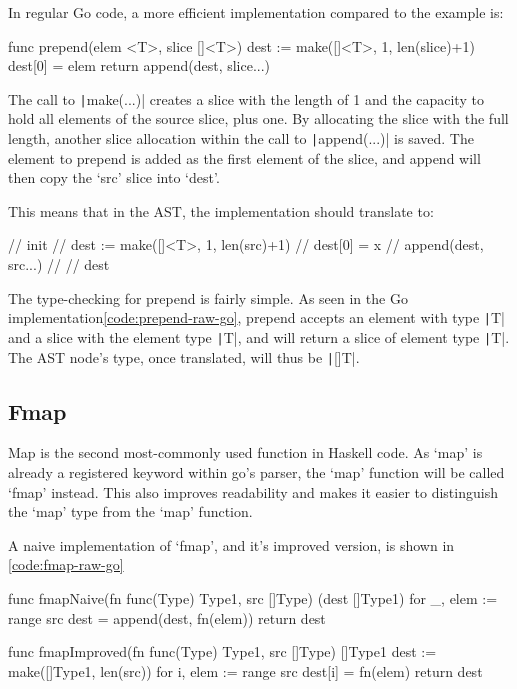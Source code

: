 In regular Go code, a more efficient implementation compared to the example is:
\begin{code}
\label{code:prepend-raw-go}
\begin{gocode}
func prepend(elem <T>, slice []<T>) {
    dest := make([]<T>, 1, len(slice)+1)
    dest[0] = elem
    return append(dest, slice...)
}
\end{gocode}
\end{code}

The call to \texttt|make(...)| creates a slice with the length of 1 and the capacity
to hold all elements of the source slice, plus one. By allocating the slice with the full
length, another slice allocation within the call to \texttt|append(...)| is saved.
The element to prepend is added as the first element of the slice, and append will then
copy the `src' slice into `dest'.

This means that in the AST, the implementation should translate to:
\begin{code}
\begin{gocode}
//   init {
//     dest := make([]<T>, 1, len(src)+1)
//     dest[0] = x
//     append(dest, src...)
//   }
//   dest
\end{gocode}
\end{code}

The type-checking for prepend is fairly simple. As seen in the Go implementation\ref{code:prepend-raw-go},
prepend accepts an element with type \texttt|T| and a slice with the element type \texttt|T|,
and will return a slice of element type \texttt|T|. The AST node's type, once translated,
will thus be \texttt|[]T|.

\subsection{Fmap}

Map is the second most-commonly used function in Haskell code. As `map' is already a registered keyword
within go's parser, the `map' function will be called `fmap' instead. This also improves readability
and makes it easier to distinguish the `map' type from the `map' function.

A naive implementation of `fmap', and it's improved version, is shown
in \ref{code:fmap-raw-go}

\begin{code}
    \label{code:fmap-raw-go}
    \begin{gocode}
func fmapNaive(fn func(Type) Type1, src []Type) (dest []Type1) {
    for _, elem := range src {
        dest = append(dest, fn(elem))
    }
    return dest
}

func fmapImproved(fn func(Type) Type1, src []Type) []Type1 {
    dest := make([]Type1, len(src))
    for i, elem := range src {
        dest[i] = fn(elem)
    }
    return dest
}
    \end{gocode}
\end{code}

